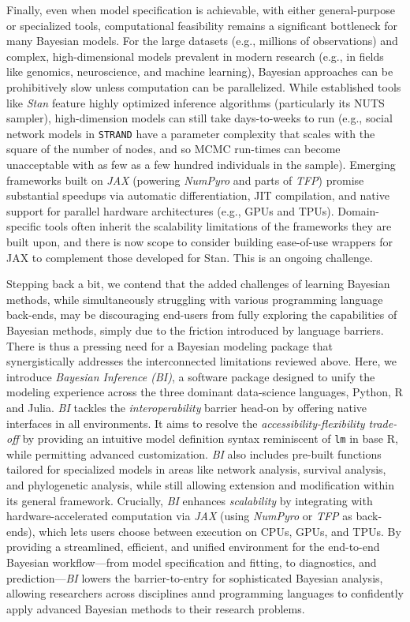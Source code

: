 \documentclass[num-refs]{wiley-article}
\begin{document}
Finally, even when model specification is achievable, with either general-purpose or specialized tools, computational feasibility remains a significant bottleneck for many Bayesian models. For the large datasets (e.g., millions of observations) and complex, high-dimensional models prevalent in modern research (e.g., in fields like genomics, neuroscience, and machine learning), Bayesian approaches can be prohibitively slow unless computation can be parallelized. While established tools like \textit{Stan} feature highly optimized inference algorithms (particularly its NUTS sampler), high-dimension models can still take days-to-weeks to run (e.g., social network models in \texttt{STRAND} have a parameter complexity that scales with the square of the number of nodes, and so MCMC run-times can become unacceptable with as few as a few hundred individuals in the sample). Emerging frameworks built on \textit{JAX} \citep{jax2018github} (powering \textit{NumPyro} and parts of \textit{TFP}) promise substantial speedups via automatic differentiation, JIT compilation, and native support for parallel hardware architectures (e.g., GPUs and TPUs). Domain-specific tools often inherit the scalability limitations of the frameworks they are built upon, and there is now scope to consider building ease-of-use wrappers for JAX to complement those developed for Stan. This is an ongoing challenge. 

Stepping back a bit, we contend that the added challenges of learning Bayesian methods, while simultaneously struggling with various programming language back-ends, may be discouraging end-users from fully exploring the capabilities of Bayesian methods, simply due to the friction introduced by language barriers. There is thus a pressing need for a Bayesian modeling package that synergistically addresses the interconnected limitations reviewed above. Here, we introduce \textit{Bayesian Inference (BI)}, a software package designed to unify the modeling experience across the three dominant data-science languages, Python, R and Julia. \textit{BI} tackles the \textit{interoperability} barrier head-on by offering native interfaces in all environments. It aims to resolve the \textit{accessibility-flexibility trade-off} by providing an intuitive model definition syntax reminiscent of \texttt{lm} in base R, while permitting advanced customization. \textit{BI} also includes pre-built functions tailored for specialized models in areas like network analysis, survival analysis, and phylogenetic analysis, while still allowing extension and modification within its general framework. Crucially, \textit{BI} enhances \textit{scalability} by integrating with hardware-accelerated computation via \textit{JAX} (using \textit{NumPyro} or \textit{TFP} as back-ends), which lets users choose between execution on CPUs, GPUs, and TPUs. By providing a streamlined, efficient, and unified environment for the end-to-end Bayesian workflow---from model specification and fitting, to diagnostics, and prediction---\textit{BI} lowers the barrier-to-entry for sophisticated Bayesian analysis, allowing researchers across disciplines annd programming languages to confidently apply advanced Bayesian methods to their research problems.
\end{document}
